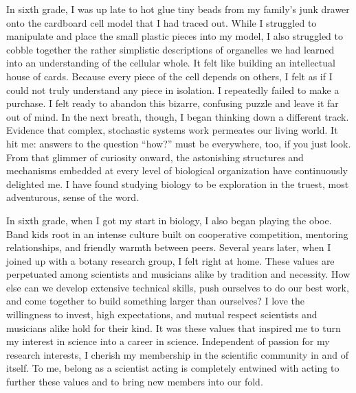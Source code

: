 
In sixth grade, I was up late to hot glue tiny beads from my family's junk drawer onto the cardboard cell model that I had traced out.
While I struggled to manipulate and place the small plastic pieces into my model, I also struggled to cobble together the rather simplistic descriptions of organelles we had learned into an understanding of the cellular whole.
It felt like building an intellectual house of cards.
Because every piece of the cell depends on others, I felt as if I could not truly understand any piece in isolation.
I repeatedly failed to make a purchase.
I felt ready to abandon this bizarre, confusing puzzle and leave it far out of mind.
In the next breath, though, I began thinking down a different track.
Evidence that complex, stochastic systems work permeates our living world.
It hit me: answers to the question ``how?'' must be everywhere, too, if you just look.
From that glimmer of curiosity onward, the astonishing structures and mechanisms embedded at every level of biological organization have continuously delighted me.
I have found studying biology to be exploration in the truest, most adventurous, sense of the word.

In sixth grade, when I got my start in biology, I also began playing the oboe.
Band kids root in an intense culture built on cooperative competition, mentoring relationships, and friendly warmth between peers.
Several years later, when I joined up with a botany research group, I felt right at home.
These values are perpetuated among scientists and musicians alike by tradition and necessity.
How else can we develop extensive technical skills, push ourselves to do our best work, and come together to build something larger than ourselves?
I love the willingness to invest, high expectations, and mutual respect scientists and musicians alike hold for their kind.
It was these values that inspired me to turn my interest in science into a career in science.
Independent of passion for my research interests, I cherish my membership in the scientific community in and of itself.
To me, belong as a scientist acting is completely entwined with acting to further these values and to bring new members into our fold.
